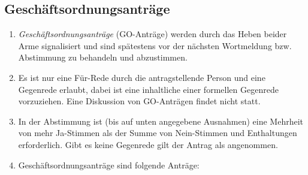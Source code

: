 \documentclass[
  a4paper,
  oneside]{scrartcl}
\providecommand{\tightlist}{%
  \setlength{\itemsep}{0pt}\setlength{\parskip}{0pt}}
\begin{document}
\subsection{Geschäftsordnungsanträge}\label{geschuxe4ftsordnungsantruxe4ge}

\begin{enumerate}
\def\labelenumi{\arabic{enumi}.}
\tightlist
\item
  \emph{Geschäftsordnungsanträge} (GO-Anträge) werden durch das Heben
  beider Arme signalisiert und sind spätestens vor der nächsten
  Wortmeldung bzw. Abstimmung zu behandeln und abzustimmen.
\item
  Es ist nur eine Für-Rede durch die antragstellende Person und eine
  Gegenrede erlaubt, dabei ist eine inhaltliche einer formellen
  Gegenrede vorzuziehen. Eine Diskussion von GO-Anträgen findet nicht
  statt.
\item
  In der Abstimmung ist (bis auf unten angegebene Ausnahmen) eine
  Mehrheit von mehr Ja-Stimmen als der Summe von Nein-Stimmen und
  Enthaltungen erforderlich. Gibt es keine Gegenrede gilt der Antrag als
  angenommen.
\item
  Geschäftsordnungsanträge sind folgende Anträge:


\end{enumerate}
\end{document}
